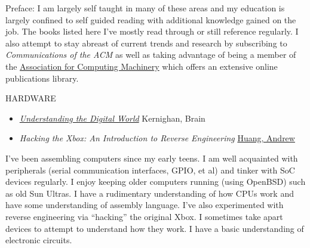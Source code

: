 \documentclass[12pt]{report}
\begin{document}
Preface: I am largely self taught in many of these areas and my education is largely confined to self guided reading with additional knowledge gained on the job. The books listed here I've mostly read through or still reference regularly. I also attempt to stay abreast of current trends and research by subscribing to \emph {Communications of the ACM} as well as taking advantage of being a member of the \href{https://www.acm.org/}{Association for Computing Machinery} which offers an extensive online publications library.\hfill \break

HARDWARE
\begin{itemize}
        \item \href{https://press.princeton.edu/books/ebook/9780691218960/understanding-the-digital-world}{\emph {Understanding the Digital World}} Kernighan, Brain
        \item \emph {Hacking the Xbox: An Introduction to Reverse Engineering} \href{https://en.wikipedia.org/wiki/Andrew_Huang_(hacker)}{Huang, Andrew}
\end{itemize}
I've been assembling computers since my early teens. I am well acquainted with peripherals (serial communication interfaces, GPIO, et al) and tinker with SoC devices regularly. I enjoy keeping older computers running (using OpenBSD) such as old Sun Ultras. I have a rudimentary understanding of how CPUs work and have some understanding of assembly language. I've also experimented with reverse engineering via ``hacking'' the original Xbox. I sometimes take apart devices to attempt to understand how they work. I have a basic understanding of electronic circuits.\hfill \break
\end{document}

